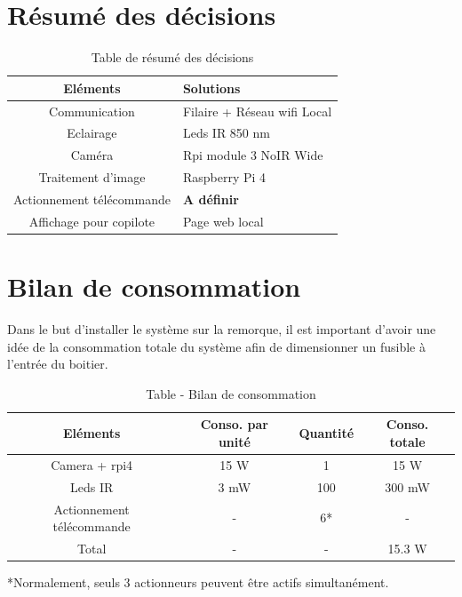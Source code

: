 \section{Résumé des décisions}
\begin{table}[H]
    \begin{center}
        \caption{Table de résumé des décisions}
        \begin{tabular}{|c|l|}
            Eléments                  & Solutions                         \\ \hline
            Communication             & Filaire + Réseau \Gls{wifi} Local \\
            Eclairage                 & Leds IR 850 \si{\nano\metre}      \\
            Caméra                    & Rpi module 3 NoIR Wide            \\
            Traitement d'image        & Raspberry Pi 4                    \\
            Actionnement télécommande & \textbf{A définir}                \\
            Affichage pour copilote   & Page web local                    \\
        \end{tabular}
    \end{center}
\end{table}
\newpage
\section{Bilan de consommation}
Dans le but d'installer le système sur la remorque, il est important d'avoir une idée de la consommation totale du système afin de dimensionner
un fusible à l'entrée du boitier.

\begin{table}[H]
    \begin{center}
        \caption{Table - Bilan de consommation}
        \begin{tabular}{|c|c|c|c|}
            Eléments                  & Conso. par unité   & Quantité & Conso. totale        \\ \hline
            Camera + \Gls{rpi4}       & 15 \si{\watt}      & 1        & 15    \si{\watt}     \\
            Leds IR                   & 3 \si{\milli\watt} & 100      & 300 \si{\milli\watt} \\
            Actionnement télécommande & -                  & 6*       & -                    \\
            Total                     & -                  & -        & 15.3 \si{\watt}      \\
        \end{tabular}
    \end{center}

    *Normalement, seuls 3 actionneurs peuvent être actifs simultanément.
\end{table}

